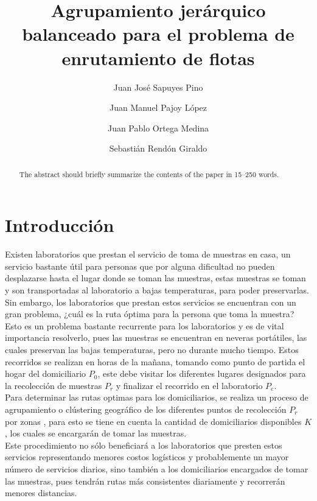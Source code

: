 \documentclass[runningheads]{llncs}
\begin{document}
%
\title{Agrupamiento jerárquico balanceado para el problema de enrutamiento de flotas}
%
%
\author{Juan José Sapuyes Pino \and
    Juan Manuel Pajoy López \and
    Juan Pablo Ortega Medina \and
    Sebastián Rendón Giraldo}
%
\authorrunning{}
%
%
\maketitle              %
%
\begin{abstract}
    The abstract should briefly summarize the contents of the paper in
    15--250 words.
\end{abstract}

\section{Introducción}
Existen laboratorios que prestan el servicio de toma de muestras en casa,
un servicio bastante útil para personas que por alguna dificultad no pueden desplazarse
hasta el lugar donde se toman las muestras, estas muestras se toman y son transportadas
al laboratorio a bajas temperaturas, para poder preservarlas. Sin embargo, los laboratorios
que prestan estos servicios se encuentran con un gran problema, ¿cuál es la ruta óptima para
la persona que toma la muestra? Esto es un problema bastante recurrente para los laboratorios
y es de vital importancia resolverlo, pues las muestras se encuentran en neveras portátiles,
las cuales preservan las bajas temperaturas, pero no durante mucho tiempo.  Estos recorridos se
realizan en horas de la mañana, tomando como punto de partida el hogar del domiciliario $P_{0}$,
este debe visitar los diferentes lugares designados para la recolección de muestras $P_{r}$ y
finalizar el recorrido en el laboratorio $P_{e}$.
\\
Para determinar las rutas optimas para los domiciliarios, se realiza un proceso de agrupamiento
o clústering geográfico de los diferentes puntos de recolección $P_{r}$ por zonas \cite{bard11},
para esto se tiene en cuenta la cantidad de domiciliarios disponibles $K$, los cuales se encargarán
de tomar las muestras.
\\
Este procedimiento no sólo beneficiará a los laboratorios que presten estos servicios representando
menores costos logísticos y probablemente un mayor número de servicios diarios, sino también a los
domiciliarios encargados de tomar las muestras, pues tendrán rutas más consistentes diariamente y
recorrerán menores distancias.
\end{document}
